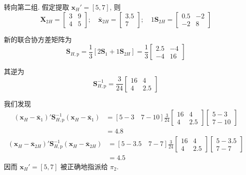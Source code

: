 转向第二组. 假定提取 $\mathbf{x}_H'=[5,7]$, 则
\[
\mathbf{X}_{2H}=\begin{bmatrix}3&9\\4&5\end{bmatrix};\quad \bar{\mathbf{x}}_{2H}=\begin{bmatrix}3.5\\7\end{bmatrix};\quad 1\mathbf{S}_{2H}=\begin{bmatrix}0.5&-2\\-2&8\end{bmatrix}
\]

新的联合协方差矩阵为
\[
\mathbf{S}_{H,\mathrm{p}}=\frac{1}{3}[2\mathbf{S}_1+1\mathbf{S}_{2H}]=\frac{1}{3}\begin{bmatrix}2.5&-4\\-4&16\end{bmatrix}
\]

其逆为
\[
\mathbf{S}_{H,\mathrm{p}}^{-1}=\frac{3}{24}\begin{bmatrix}16&4\\4&2.5\end{bmatrix}
\]

我们发现
\[
\begin{aligned}
(\mathbf{x}_H-\bar{\mathbf{x}}_1)'\mathbf{S}_{H,\mathrm{p}}^{-1}(\mathbf{x}_H-\bar{\mathbf{x}}_1)&=[5-3\quad 7-10]\frac{3}{24}\begin{bmatrix}16&4\\4&2.5\end{bmatrix}\begin{bmatrix}5-3\\7-10\end{bmatrix}\\
&=4.8
\end{aligned}
\]
\[
\begin{aligned}
(\mathbf{x}_H-\bar{\mathbf{x}}_{2H})'\mathbf{S}_{H,\mathrm{p}}^{-1}(\mathbf{x}_H-\bar{\mathbf{x}}_{2H})&=[5-3.5\quad 7-7]\frac{3}{24}\begin{bmatrix}16&4\\4&2.5\end{bmatrix}\begin{bmatrix}5-3.5\\7-7\end{bmatrix}\\
&=4.5
\end{aligned}
\]
因而 $\mathbf{x}_H'=[5,7]$ 被正确地指派给 $\pi_2$.


